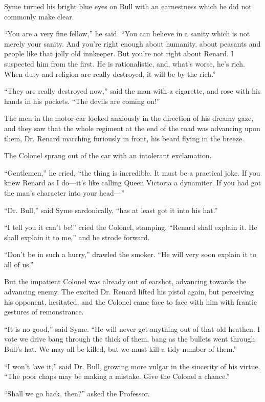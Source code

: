 \documentclass{book}
\begin{document}
Syme turned his bright blue eyes on Bull with an earnestness which he did not commonly make clear.

“You are a very fine fellow,” he said. “You can believe in a sanity which is not merely your sanity. And you’re right enough about humanity, about peasants and people like that jolly old innkeeper. But you’re not right about Renard. I suspected him from the first. He is rationalistic, and, what’s worse, he’s rich. When duty and religion are really destroyed, it will be by the rich.”

“They are really destroyed now,” said the man with a cigarette, and rose with his hands in his pockets. “The devils are coming on!”

The men in the motor-car looked anxiously in the direction of his dreamy gaze, and they saw that the whole regiment at the end of the road was advancing upon them, Dr. Renard marching furiously in front, his beard flying in the breeze.

The Colonel sprang out of the car with an intolerant exclamation.

“Gentlemen,” he cried, “the thing is incredible. It must be a practical joke. If you knew Renard as I do—it’s like calling Queen Victoria a dynamiter. If you had got the man’s character into your head—”

“Dr. Bull,” said Syme sardonically, “has at least got it into his hat.”

“I tell you it can’t be!” cried the Colonel, stamping. “Renard shall explain it. He shall explain it to me,” and he strode forward.

“Don’t be in such a hurry,” drawled the smoker. “He will very soon explain it to all of us.”

But the impatient Colonel was already out of earshot, advancing towards the advancing enemy. The excited Dr. Renard lifted his pistol again, but perceiving his opponent, hesitated, and the Colonel came face to face with him with frantic gestures of remonstrance.

“It is no good,” said Syme. “He will never get anything out of that old heathen. I vote we drive bang through the thick of them, bang as the bullets went through Bull’s hat. We may all be killed, but we must kill a tidy number of them.”

“I won’t ’ave it,” said Dr. Bull, growing more vulgar in the sincerity of his virtue. “The poor chaps may be making a mistake. Give the Colonel a chance.”

“Shall we go back, then?” asked the Professor.
\end{document}

